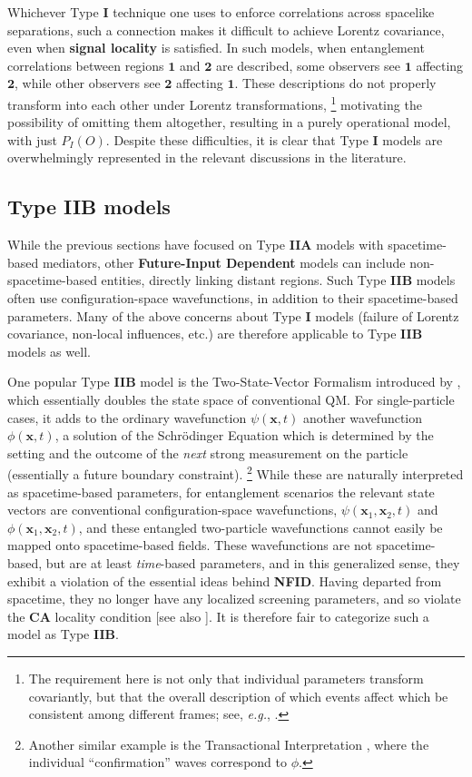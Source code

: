 \documentclass[rmp, aps, preprint, longbibliography]{revtex4-1}
\begin{document}
Whichever Type {\bf I} technique one uses to enforce correlations across spacelike separations, such a connection makes it difficult to achieve Lorentz covariance, even when {\bf signal locality} is satisfied.  In such models, when entanglement correlations between regions $\bm{1}$ and $\bm{2}$ are described, some observers see $\bm{1}$ affecting $\bm{2}$, while other observers see $\bm{2}$ affecting $\bm{1}$.  These descriptions do not properly transform into each other under Lorentz transformations,%
\footnote{The requirement here is not only that individual parameters transform covariantly, but that the overall description of which events affect which be consistent among different frames; see, \emph{e.g.}, \textcite{gisin2010}.}
motivating the possibility of omitting them altogether, resulting in a purely operational model, with just $P_I(O)$.  Despite these difficulties, it is clear that Type {\bf I} models are overwhelmingly represented in the relevant discussions in the literature.


\subsection{Type {\bf IIB} models}

While the previous sections have focused on Type {\bf IIA} models with spacetime-based mediators, other {\bf Future-Input Dependent} models can include non-spacetime-based entities, directly linking distant regions.  Such Type {\bf IIB} models often use configuration-space wavefunctions, in addition to their spacetime-based parameters.  Many of the above concerns about Type {\bf I} models (failure of Lorentz covariance, non-local influences, etc.) are therefore applicable to Type {\bf IIB} models as well. 

One popular Type {\bf IIB} model is the Two-State-Vector Formalism introduced by \textcite{aharonov1991}, which essentially doubles the state space of conventional QM.  For single-particle cases, it adds to the ordinary wavefunction $\psi(\bm{x},t)$ another wavefunction $\phi({\bm{x},t})$, a solution of the Schr\"odinger Equation which is determined by the setting and the outcome of the \emph{next} strong measurement on the particle (essentially a future boundary constraint).%
\footnote{Another similar example is the Transactional Interpretation \cite{cramer1980, cramer2016}, where the individual ``confirmation'' waves correspond to $\phi$.}  While these are naturally interpreted as spacetime-based parameters, for entanglement scenarios the relevant state vectors are conventional configuration-space wavefunctions, $\psi(\bm{x}_1,\bm{x}_2,t)$ and $\phi(\bm{x}_1,\bm{x}_2,t)$, and these entangled two-particle wavefunctions cannot easily be mapped onto spacetime-based fields. 
These wavefunctions are not spacetime-based, but are at least \emph{time}-based parameters, and in this generalized sense, they exhibit a violation of the essential ideas behind {\bf NFID}.  Having departed from spacetime, they no longer have any localized screening parameters, and so violate the {\bf CA} locality condition [see also \textcite{vaidman2013}].  It is therefore fair to categorize such a model as Type {\bf IIB}.
\end{document}
